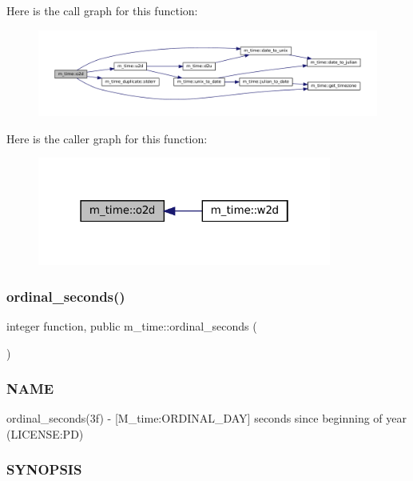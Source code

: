 Here is the call graph for this function\+:\nopagebreak
\begin{figure}[H]
\begin{center}
\leavevmode
\includegraphics[width=350pt]{namespacem__time_a55e2cb9efc9d4d209ae2864f073d4f19_cgraph}
\end{center}
\end{figure}
Here is the caller graph for this function\+:
\nopagebreak
\begin{figure}[H]
\begin{center}
\leavevmode
\includegraphics[width=274pt]{namespacem__time_a55e2cb9efc9d4d209ae2864f073d4f19_icgraph}
\end{center}
\end{figure}
\mbox{\label{namespacem__time_ab8960d2aa60e134bcf77247d8b257963}} 
\subsubsection{\texorpdfstring{ordinal\+\_\+seconds()}{ordinal\_seconds()}}
{\footnotesize\ttfamily integer function, public m\+\_\+time\+::ordinal\+\_\+seconds (\begin{DoxyParamCaption}{ }\end{DoxyParamCaption})}



\subsubsection*{N\+A\+ME}

ordinal\+\_\+seconds(3f) -\/ \mbox{[}M\+\_\+time\+:O\+R\+D\+I\+N\+A\+L\+\_\+\+D\+AY\mbox{]} seconds since beginning of year (L\+I\+C\+E\+N\+SE\+:PD) \subsubsection*{S\+Y\+N\+O\+P\+S\+IS}

